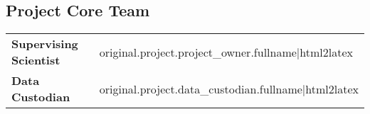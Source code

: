 \subsection*{Project Core Team}
\begin{tabu} {X X}
\textbf{Supervising Scientist} & {{ original.project.project_owner.fullname|html2latex }}\\
\textbf{Data Custodian} & {{ original.project.data_custodian.fullname|html2latex }}\\
\end{tabu}

